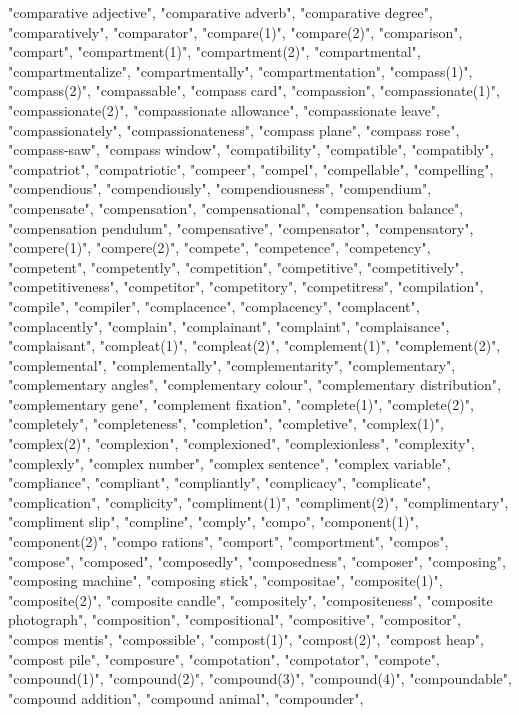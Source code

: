 "comparative adjective",
"comparative adverb",
"comparative degree",
"comparatively",
"comparator",
"compare(1)",
"compare(2)",
"comparison",
"compart",
"compartment(1)",
"compartment(2)",
"compartmental",
"compartmentalize",
"compartmentally",
"compartmentation",
"compass(1)",
"compass(2)",
"compassable",
"compass card",
"compassion",
"compassionate(1)",
"compassionate(2)",
"compassionate allowance",
"compassionate leave",
"compassionately",
"compassionateness",
"compass plane",
"compass rose",
"compass-saw",
"compass window",
"compatibility",
"compatible",
"compatibly",
"compatriot",
"compatriotic",
"compeer",
"compel",
"compellable",
"compelling",
"compendious",
"compendiously",
"compendiousness",
"compendium",
"compensate",
"compensation",
"compensational",
"compensation balance",
"compensation pendulum",
"compensative",
"compensator",
"compensatory",
"compere(1)",
"compere(2)",
"compete",
"competence",
"competency",
"competent",
"competently",
"competition",
"competitive",
"competitively",
"competitiveness",
"competitor",
"competitory",
"competitress",
"compilation",
"compile",
"compiler",
"complacence",
"complacency",
"complacent",
"complacently",
"complain",
"complainant",
"complaint",
"complaisance",
"complaisant",
"compleat(1)",
"compleat(2)",
"complement(1)",
"complement(2)",
"complemental",
"complementally",
"complementarity",
"complementary",
"complementary angles",
"complementary colour",
"complementary distribution",
"complementary gene",
"complement fixation",
"complete(1)",
"complete(2)",
"completely",
"completeness",
"completion",
"completive",
"complex(1)",
"complex(2)",
"complexion",
"complexioned",
"complexionless",
"complexity",
"complexly",
"complex number",
"complex sentence",
"complex variable",
"compliance",
"compliant",
"compliantly",
"complicacy",
"complicate",
"complication",
"complicity",
"compliment(1)",
"compliment(2)",
"complimentary",
"compliment slip",
"compline",
"comply",
"compo",
"component(1)",
"component(2)",
"compo rations",
"comport",
"comportment",
"compos",
"compose",
"composed",
"composedly",
"composedness",
"composer",
"composing",
"composing machine",
"composing stick",
"compositae",
"composite(1)",
"composite(2)",
"composite candle",
"compositely",
"compositeness",
"composite photograph",
"composition",
"compositional",
"compositive",
"compositor",
"compos mentis",
"compossible",
"compost(1)",
"compost(2)",
"compost heap",
"compost pile",
"composure",
"compotation",
"compotator",
"compote",
"compound(1)",
"compound(2)",
"compound(3)",
"compound(4)",
"compoundable",
"compound addition",
"compound animal",
"compounder",
